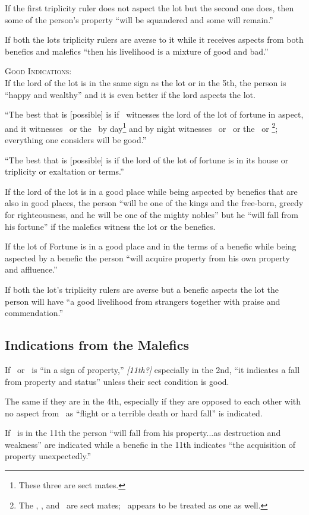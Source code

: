 If the first triplicity ruler does not aspect the lot but the second one does, then some of the person's property ``will be squandered and some will remain.''

If both the lots triplicity rulers are averse to it while it receives aspects from both benefics and malefics ``then his livelihood is a mixture of good and bad.''

\noindent\textsc{Good Indications:} \hfill \\
If the lord of the lot is in the same sign as the lot or in the 5th, the person is ``happy and wealthy'' and it is even better if the lord aspects the lot.

``The best that is [possible] is if \Saturn\, witnesses the lord of the lot of fortune in aspect, and it witnesses \Jupiter\, or the \Sun\, by day\footnote{These three are sect mates.} and by night witnesses \Mars\, or \Venus\, or the \Moon\, or \Mercury\footnote{The \Moon, \Venus, and \Mars\, are sect mates; \Mercury\, appears to be treated as one as well.}; everything one considers will be good.''

``The best that is [possible] is if the lord of the lot of fortune is in its house or triplicity or exaltation or terms.''

If the lord of the lot is in a good place while being aspected by benefics that are also in good places, the person ``will be one of the kings and the free-born, greedy for righteousness, and he will be one of the mighty nobles'' but he ``will fall from his fortune'' if the malefics witness the lot or the benefics.

If the lot of Fortune is in a good place and in the terms of a benefic while being aspected by a benefic the person ``will acquire property from his own property and affluence.''

If both the lot's triplicity rulers are averse but a benefic aspects the lot the person will have ``a good livelihood from strangers together with praise and commendation.''

\subsection{Indications from the Malefics}
If \Saturn\, or \Mars\, is ``in a sign of property,''  \textsl{[11th?]} especially in the 2nd, ``it indicates a fall from property and status'' unless their sect condition is good.

The same if they are in the 4th, especially if they are opposed to each other with no aspect from \Jupiter\, as ``flight or a terrible death or hard fall'' is indicated.

If \Mars\, is in the 11th the person ``will fall from his property...as destruction and weakness'' are indicated while a benefic in the 11th indicates ``the acquisition of property unexpectedly.''



